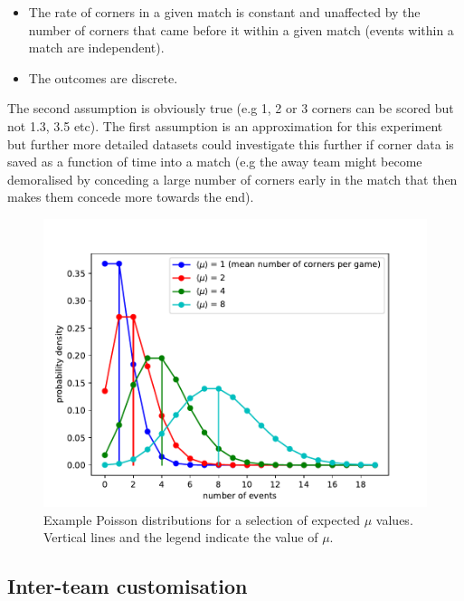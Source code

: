 \documentclass[10pt]{article}
\begin{document}
\begin{itemize}
\item The rate of corners in a given match is constant and unaffected by the number of corners that came before it within a given match (events within a match are independent).

\item The outcomes are discrete. 

\end{itemize}

The second assumption is obviously true (e.g 1, 2 or 3 corners can be scored but not 1.3, 3.5 etc). The first assumption is an approximation for this experiment but further more detailed datasets could investigate this further if corner data is saved as a function of time into a match (e.g the away team might become demoralised by conceding a large number of corners early in the match that then makes them concede more towards the end).


 



\begin{figure}
\begin{center}
\includegraphics[scale=1.0,angle=0,trim=0cm 0cm 0cm 0cm]{fig_poison.pdf}
\caption{Example Poisson distributions for a selection of expected $\mu$ values. Vertical lines and the legend indicate the value of $\mu$.}
\label{fig_poison}
\end{center}
\end{figure} 





\subsection{Inter-team customisation}
\end{document}
